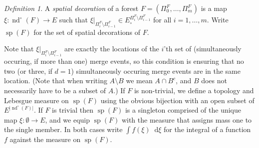 \documentclass[reqno,draft]{amsart}
\numberwithin{equation}{section}
\theoremstyle{plain}
\theoremstyle{remark}
\newtheorem{definition}[theorem]{Definition}
\renewcommand{\P}{\mathbb{P}} %
\newcommand*\diff{\mathop{}\!\mathrm{d}}
\newcommand{\e}{\mathrm{e}}
\newcommand{\fpart}{\Pi} %
\DeclareMathOperator{\nd}{nd}
\DeclareMathOperator{\dct}{tm}
\DeclareMathOperator{\dcs}{sp}
\DeclareMathOperator{\tm}{Tm}
\newcommand{\ftm}{f_\mathrm{tm}^{\boldsymbol \lambda}}
\begin{document}
%

\begin{definition}\label{def:xi}
    A \emph{spatial decoration} of a forest $F=(\fpart^F_0, \ldots ,\fpart^F_m)$ is a map $\xi\colon \nd^\circ (F) \to E$ such that $\xi\vert_{\fpart^F_i \setminus \fpart^F_{i-1}} \in E^{\fpart^F_i \setminus \fpart^F_{i-1}}_\circ $ for all $i=1, \ldots ,m$. Write $\dcs(F)$ for the set of spatial decorations of $F$.
\end{definition}
Note that $\xi\vert_{\fpart^F_i \setminus \fpart^F_{i-1}}$ are exactly the locations of the $i$'th set of (simultaneously occuring, if more than one) merge events, so this condition is ensuring that no two (or three, if $d = 1$) simultaneously occuring merge events are in the same location. (Note that when writing $A \setminus B$ we mean $A \cap B^c$, and $B$ does not necessarily have to be a subset of $A$.)
If $F$ is non-trivial, we define a topology and Lebesgue measure on $\dcs(F)$ using the obvious bijection with an open subset of $E^{|\nd^\circ (F)|}$. If $F$ is trivial then $\dcs(F)$ is a singleton comprised of the unique map $\xi\colon \emptyset \to E$, and we equip $\dcs(F)$ with the measure that assigns mass one to the single member. In both cases write $\int f(\xi) \diff \xi$ for the integral of a function $f$ against the measure on $\dcs(F)$.
\end{document}
